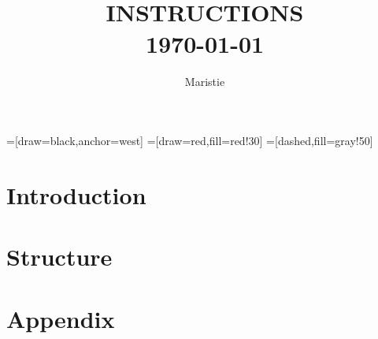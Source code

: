


=[draw=black,anchor=west]
=[draw=red,fill=red!30]
=[dashed,fill=gray!50]
\title{
        \HRule{2pt}\\
        \LARGE \textbf{\uppercase{Instructions}}
        \HRule{2pt} \\ [0.5cm]
        \normalsize \today \vspace*{5\baselineskip}}

\date{}

\author{Maristie}

\maketitle
\tableofcontents
\setcounter{page}{0}
\thispagestyle{empty}
\newpage

\section*{Introduction}

\section{Structure}



\newpage
\section*{Appendix}


